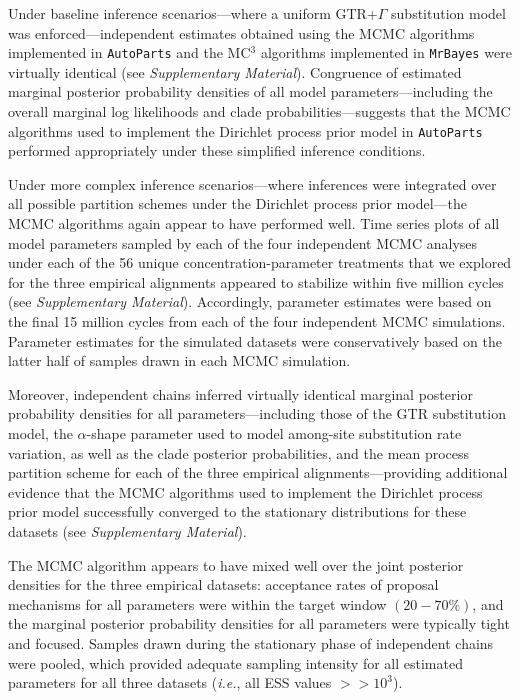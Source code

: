 \documentclass[11pt]{article}
\begin{document}
Under baseline inference scenarios---where a uniform GTR+$\Gamma$ substitution model was enforced---independent estimates obtained using the MCMC algorithms implemented in \verb!AutoParts! and the MC$^3$ algorithms implemented in \verb!MrBayes! were virtually identical (see {\it Supplementary Material}).
Congruence of estimated marginal posterior probability densities of all model parameters---including the overall marginal log likelihoods and clade probabilities---suggests that the MCMC algorithms used to implement the Dirichlet process prior model in \verb!AutoParts! performed appropriately under these simplified inference conditions.

Under more complex inference scenarios---where inferences were integrated over all possible partition schemes under the Dirichlet process prior model---the MCMC algorithms again appear to have performed well. 
Time series plots of all model parameters sampled by each of the four independent MCMC analyses under each of the 56 unique concentration-parameter treatments that we explored for the three empirical alignments appeared to stabilize within five million cycles (see {\it Supplementary Material}).
Accordingly, parameter estimates were based on the final 15 million cycles from each of the four independent MCMC simulations.
Parameter estimates for the simulated datasets were conservatively based on the latter half of samples drawn in each MCMC simulation.

Moreover, independent chains inferred virtually identical marginal posterior probability densities for all parameters---including those of the GTR substitution model, the $\alpha$-shape parameter used to model among-site substitution rate variation, as well as the clade posterior probabilities, and the mean process partition scheme for each of the three empirical alignments---providing additional evidence that the MCMC algorithms used to implement the Dirichlet process prior model successfully converged to the stationary distributions for these datasets (see {\it Supplementary Material}). 

The MCMC algorithm appears to have mixed well over the joint posterior densities for the three empirical datasets: acceptance rates of proposal mechanisms for all parameters were within the target window $({20-70\%})$, and the marginal posterior probability densities for all parameters were typically tight and focused.  
Samples drawn during the stationary phase of independent chains were pooled, which provided adequate sampling intensity for all estimated parameters for all three datasets ({\it i.e.}, all ESS values ${>>10^3}$).
\end{document}
